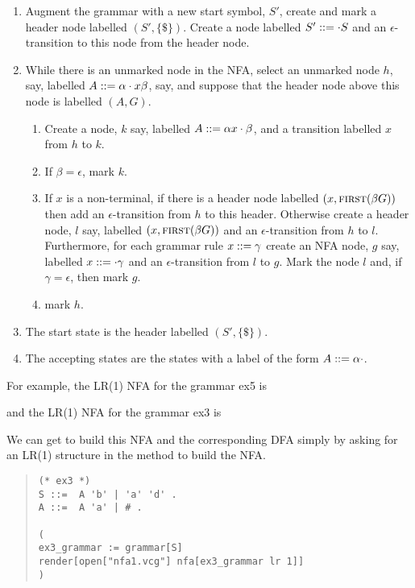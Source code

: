 \begin{enumerate}
\item Augment the grammar with a new start symbol, $S'$,
create and mark a header node labelled $(S',\{\$\})$.
Create a node labelled $S'::=\cdot S$ and an $\epsilon$-transition
to this node from the header node. 

\item
While there is an unmarked node in the NFA, select an unmarked node
$h$, say, labelled  $A::= \alpha\cdot x\beta$, say, and suppose that
the header node above this node is labelled $(A,G)$.
\begin{enumerate}
\item
Create a node, $k$ say, labelled $A::= \alpha x\cdot\beta$, and a
transition labelled $x$ from $h$ to $k$.
\item
If $\beta=\epsilon$, mark $k$.
\item
If $x$ is a non-terminal, if there is a header node labelled
$(x,\mbox{\sc first}(\beta G))$ then add an $\epsilon$-transition from $h$ to
this header. Otherwise create a header node, $l$ say, labelled
$(x,\mbox{\sc first}(\beta G))$ and an $\epsilon$-transition from $h$ to $l$.
Furthermore, for each grammar rule $x::=\gamma$ create an NFA node,
$g$ say, labelled $x::=\cdot\gamma$ and an $\epsilon$-transition 
from $l$ to $g$. Mark the node $l$ and, if $\gamma=\epsilon$, 
then mark $g$.
\item mark $h$.
\end{enumerate}
\item
The start state is the header labelled $(S',\{\$\})$.
\item
The accepting states are the states with a label of the form
$A::=\alpha\cdot$.
\end{enumerate}

For example, the LR(1) NFA for the grammar ex5 is
\begin{center}
\footnotesize

\end{center}
and the LR(1) NFA for the grammar ex3 is
\begin{center}
\footnotesize

\end{center}

We can get \gtb to build this NFA and the corresponding DFA simply by
asking for an LR(1) structure in the method to build the NFA.
\begin{quote}
\begin{verbatim}
(* ex3 *)
S ::=  A 'b' | 'a' 'd' .
A ::=  A 'a' | # .

(
ex3_grammar := grammar[S]
render[open["nfa1.vcg"] nfa[ex3_grammar lr 1]]
)
\end{verbatim}
\end{quote}
\begin{center}
\\[2mm]
\end{center}

